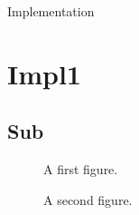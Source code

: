 Implementation

\section{Impl1} \label{sec:impl1}

\subsection{Sub}

\begin{figure}
\caption{A first figure.}
\end{figure}

\begin{figure}
\caption{A second figure.}
\end{figure}